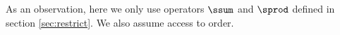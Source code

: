 
As an observation, here we only use operators $\ssum$ and $\sprod$ defined in section \ref{sec:restrict}. 
We also assume access to order.





